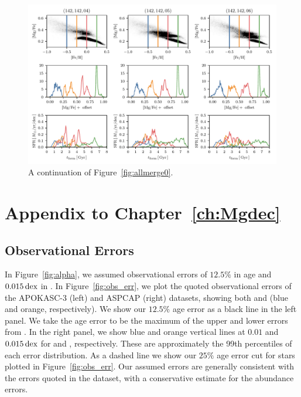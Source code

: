 \begin{appendices}
\begin{figure}
  \centering
  \includegraphics[width=\textwidth]{ch3/allmerge8.pdf}
  \caption{A continuation of Figure~\ref{fig:allmerge0}.}
  \label{fig:allmerge8}
\end{figure}

\chapter{Appendix to Chapter~\ref{ch:Mgdec}}\label{ch:app_Mgdec}
\section{Observational Errors}\label{ch4:app:obs_err}
In Figure~\ref{fig:alpha}, we assumed observational errors of $12.5\%$ in age and $0.015\,\textrm{dex}$ in \MgFe{}. In Figure~\ref{fig:obs_err}, we plot the quoted observational errors of the APOKASC-3 (left) and ASPCAP (right) datasets, showing both \FeH{} and \MgFe{} (blue and orange, respectively). We show our $12.5\%$ age error as a black line in the left panel. We take the age error to be the maximum of the upper and lower errors from \citet{2018ApJS..239...32P}. In the right panel, we show blue and orange vertical lines at $0.01$ and $0.015\,\textrm{dex}$ for \FeH{} and \MgFe{}, respectively. These are approximately the 99th percentiles of each error distribution. As a dashed line we show our $25\%$ age error cut for stars plotted in Figure~\ref{fig:obs_err}. Our assumed errors are generally consistent with the errors quoted in the dataset, with a conservative estimate for the abundance errors.


\end{appendices}
